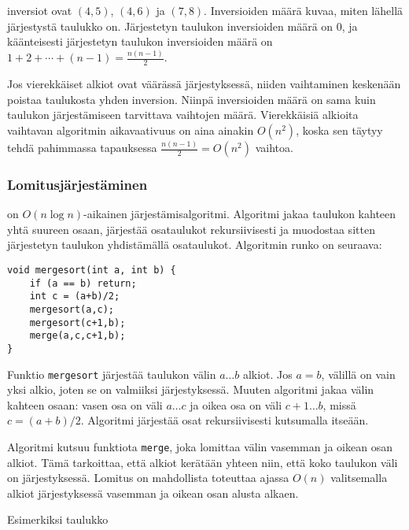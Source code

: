 inversiot ovat $(4,5)$, $(4,6)$ ja $(7,8)$.
Inversioiden määrä kuvaa, miten lähellä
järjestystä taulukko on.
Järjestetyn taulukon inversioiden määrä on 0,
ja käänteisesti järjestetyn taulukon
inversioiden määrä on $1+2+\cdots+(n-1)=\frac{n(n-1)}{2}$.

Jos vierekkäiset alkiot ovat väärässä järjestyksessä,
niiden vaihtaminen keskenään poistaa
taulukosta yhden inversion.
Niinpä inversioiden määrä on sama kuin
taulukon järjestämiseen tarvittava vaihtojen määrä.
Vierekkäisiä alkioita
vaihtavan algoritmin aikavaativuus
on aina ainakin $O(n^2)$,
koska sen täytyy tehdä pahimmassa tapauksessa
$\frac{n(n-1)}{2} = O(n^2)$ vaihtoa.

\subsubsection{Lomitusjärjestäminen}


on $O(n \log n)$-aikainen järjestämisalgoritmi.
Algoritmi jakaa taulukon kahteen yhtä suureen osaan,
järjestää osataulukot rekursiivisesti ja muodostaa
sitten järjestetyn taulukon yhdistämällä osataulukot.
Algoritmin runko on seuraava:
\begin{lstlisting}
void mergesort(int a, int b) {
    if (a == b) return;
    int c = (a+b)/2;
    mergesort(a,c);
    mergesort(c+1,b);
    merge(a,c,c+1,b);
}
\end{lstlisting}
Funktio \texttt{mergesort}
järjestää taulukon välin $a \ldots b$ alkiot.
Jos $a=b$, välillä on vain yksi alkio,
joten se on valmiiksi järjestyksessä.
Muuten algoritmi jakaa välin
kahteen osaan: vasen osa on väli $a \ldots c$
ja oikea osa on väli $c+1 \ldots b$, missä $c=(a+b)/2$.
Algoritmi järjestää osat rekursiivisesti
kutsumalla itseään.

Algoritmi kutsuu funktiota \texttt{merge},
joka lomittaa välin vasemman ja oikean osan alkiot.
Tämä tarkoittaa, että alkiot kerätään yhteen niin,
että koko taulukon väli on järjestyksessä.
Lomitus
on mahdollista toteuttaa ajassa $O(n)$
valitsemalla alkiot järjestyksessä vasemman ja
oikean osan alusta alkaen.

\begin{samepage}
Esimerkiksi taulukko

\begin{center}
\end{center}
\end{samepage}

